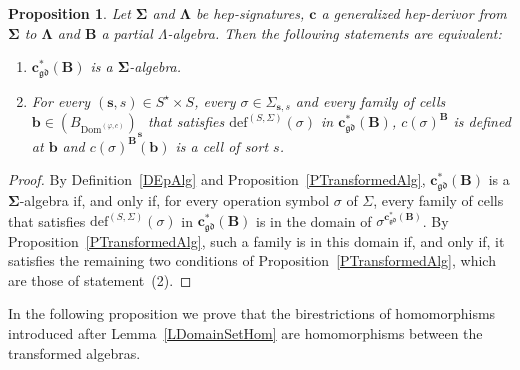 \documentclass[a4paper, reqno]{amsbook}
\newcommand{\sig}[1]{\mathbf{#1}}             %
\newcommand{\Dom}{\mathrm{Dom}}
\newcommand{\gd}{\mathfrak{gd}}              %
\theoremstyle{plain}
\newtheorem{proposition}[theorem]{Proposition}
\theoremstyle{definition}
\begin{document}
\begin{proposition}\label{PTransformedEpAlg}
Let $\sig{\Sigma}$ and $\sig{\Lambda}$ be hep-signatures, $\mathbf{c}$ a generalized hep-derivor from $\sig{\Sigma}$ to $\sig{\Lambda}$ and $\mathbf{B}$ a partial $\Lambda$-algebra.
Then the following statements are equivalent:
\begin{enumerate}
\item $\mathbf{c}^{\ast}_{\gd}(\mathbf{B})$ is a $\sig{\Sigma}$-algebra.
\item For every $(\mathbf{s},s)\in S^{\star}\times S$, every $\sigma\in\Sigma_{\mathbf{s},s}$ and every family of cells $\mathbf{b}\in(B_{\Dom^{(\varphi,c)}})_{\mathbf{s}}$ that satisfies $\mathrm{def}^{(S,\Sigma)}(\sigma)$ in $\mathbf{c}^{\ast}_{\gd}(\mathbf{B})$, $c(\sigma)^{\mathbf{B}}$ is defined at $\mathbf{b}$ and $c(\sigma)^{\mathbf{B}}(\mathbf{b})$ is a cell of sort $s$.
\end{enumerate}
\end{proposition}
\begin{proof}
By Definition~\ref{DEpAlg} and Proposition~\ref{PTransformedAlg}, $\mathbf{c}^{\ast}_{\gd}(\mathbf{B})$ is a $\sig{\Sigma}$-algebra if, and only if, for every operation symbol $\sigma$ of $\Sigma$, every family of cells that satisfies $\mathrm{def}^{(S,\Sigma)}(\sigma)$ in $\mathbf{c}^{\ast}_{\gd}(\mathbf{B})$ is in the domain of $\sigma^{\mathbf{c}^{\ast}_{\gd}(\mathbf{B})}$.
By Proposition~\ref{PTransformedAlg}, such a family is in this domain if, and only if, it satisfies the remaining two conditions of Proposition~\ref{PTransformedAlg}, which are those of statement~(2).
\end{proof}

In the following proposition we prove that the birestrictions of homomorphisms introduced after Lemma~\ref{LDomainSetHom} are homomorphisms between the transformed algebras.
\end{document}
